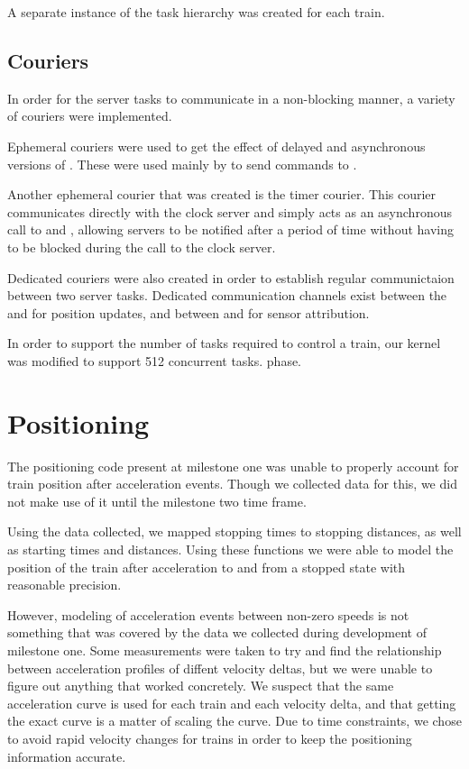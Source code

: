 \documentclass[pdftex,10pt,a4paper]{article}
\begin{document}
A separate instance of the task hierarchy was created for each train.

\subsection*{Couriers}

In order for the server tasks to communicate in a non-blocking manner,
a variety of couriers were implemented.

Ephemeral couriers were used to get the effect of delayed and
asynchronous versions of . These were used mainly by
 to send commands to .

Another ephemeral courier that was created is the timer courier. This
courier communicates directly with the clock server and simply acts as
an asynchronous call to  and , allowing
servers to be notified after a period of time without having to be
blocked during the call to the clock server.

Dedicated couriers were also created in order to establish
regular communictaion between two server tasks. Dedicated
communication channels exist between the  and
 for position updates, and between
 and  for sensor attribution.

In order to support the number of tasks required to control a train,
our kernel was modified to support 512 concurrent tasks.
phase.

\section*{Positioning}

The positioning code present at milestone one was unable to properly
account for train position after acceleration events. Though we
collected data for this, we did not make use of it until the milestone
two time frame.

Using the data collected, we mapped stopping times to stopping
distances, as well as starting times and distances. Using these
functions we were able to model the position of the train after
acceleration to and from a stopped state with reasonable precision.

However, modeling of acceleration events between non-zero speeds is
not something that was covered by the data we collected during
development of milestone one. Some measurements were taken to try and
find the relationship between acceleration profiles of diffent
velocity deltas, but we were unable to figure out anything that worked
concretely. We suspect that the same acceleration curve is used for
each train and each velocity delta, and that getting the exact curve
is a matter of scaling the curve. Due to time constraints, we chose to
avoid rapid velocity changes for trains in order to keep the
positioning information accurate.
\end{document}
